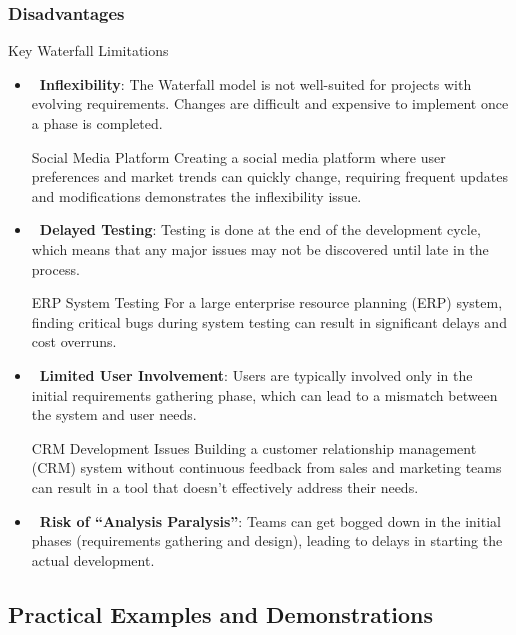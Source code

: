 \subsubsection{Disadvantages}

\begin{warningbox}{Key Waterfall Limitations}
  \begin{itemize}
    \item \textbf{\faTimesCircle\ Inflexibility}: The Waterfall model is not well-suited for projects with evolving requirements. Changes are difficult and expensive to implement once a phase is completed.
          \begin{examplecard}{Social Media Platform}
            Creating a social media platform where user preferences and market trends can quickly change, requiring frequent updates and modifications demonstrates the inflexibility issue.
          \end{examplecard}
    \item \textbf{\faClock\ Delayed Testing}: Testing is done at the end of the development cycle, which means that any major issues may not be discovered until late in the process.
          \begin{examplecard}{ERP System Testing}
            For a large enterprise resource planning (ERP) system, finding critical bugs during system testing can result in significant delays and cost overruns.
          \end{examplecard}
    \item \textbf{\faEyeSlash\ Limited User Involvement}: Users are typically involved only in the initial requirements gathering phase, which can lead to a mismatch between the system and user needs.
          \begin{examplecard}{CRM Development Issues}
            Building a customer relationship management (CRM) system without continuous feedback from sales and marketing teams can result in a tool that doesn't effectively address their needs.
          \end{examplecard}
    \item \textbf{\faPause\ Risk of ``Analysis Paralysis''}: Teams can get bogged down in the initial phases (requirements gathering and design), leading to delays in starting the actual development.
  \end{itemize}
\end{warningbox}

\subsection{Practical Examples and Demonstrations}


